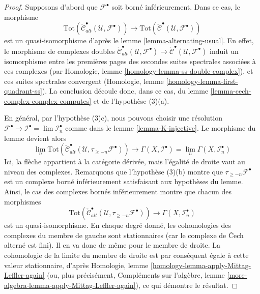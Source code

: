 \begin{proof}
Supposons d'abord que $\mathcal{F}^\bullet$ soit borné inférieurement. Dans ce cas, le morphisme $$
\text{Tot}(\check{\mathcal{C}}^\bullet_{alt}(\mathcal{U}, \mathcal{F}^\bullet))
\longrightarrow
\text{Tot}(\check{\mathcal{C}}^\bullet(\mathcal{U}, \mathcal{F}^\bullet))
$$ est un quasi-isomorphisme d'après le lemme \ref{lemma-alternating-usual}. En effet, le morphisme de complexes doubles $\check{\mathcal{C}}^\bullet_{alt}(\mathcal{U}, \mathcal{F}^\bullet) \to
\check{\mathcal{C}}^\bullet(\mathcal{U}, \mathcal{F}^\bullet)$ induit un isomorphisme entre les premières pages des secondes suites spectrales associées à ces complexes (par Homologie, lemme \ref{homology-lemma-ss-double-complex}), et ces suites spectrales convergent (Homologie, lemme \ref{homology-lemma-first-quadrant-ss}). La conclusion découle donc, dans ce cas, du lemme \ref{lemma-cech-complex-complex-computes} et de l'hypothèse (3)(a).

\medskip\noindent

En général, par l'hypothèse (3)c), nous pouvons choisir une résolution
$\mathcal{F}^\bullet \to \mathcal{I}^\bullet = \lim \mathcal{I}_n^\bullet$
comme dans le lemme \ref{lemma-K-injective}. Le morphisme du lemme devient alors
$$
\lim_n 
\text{Tot}(\check{\mathcal{C}}^\bullet_{alt}(\mathcal{U},
\tau_{\geq -n}\mathcal{F}^\bullet))
\longrightarrow
\Gamma(X, \mathcal{I}^\bullet) =
\lim_n \Gamma(X, \mathcal{I}_n^\bullet)
$$
Ici, la flèche appartient à la catégorie dérivée, mais l'égalité de droite vaut au niveau des complexes. Remarquons que l'hypothèse (3)(b) montre que $\tau_{\geq -n}\mathcal{F}^\bullet$
est un complexe borné inférieurement satisfaisant aux hypothèses du lemme. Ainsi, le cas des complexes bornés inférieurement montre que chacun des morphismes
$$
\text{Tot}(\check{\mathcal{C}}^\bullet_{alt}(\mathcal{U},
\tau_{\geq -n}\mathcal{F}^\bullet))
\longrightarrow
\Gamma(X, \mathcal{I}_n^\bullet)
$$
est un quasi-isomorphisme. En chaque degré donné, les cohomologies des complexes du membre de gauche sont stationnaires (car le complexe de {\v C}ech alterné est fini). Il en va donc de même pour le membre de droite. La cohomologie de la limite du membre de droite est par conséquent égale à cette valeur stationnaire, d'après Homologie, lemme \ref{homology-lemma-apply-Mittag-Leffler-again}
(ou, plus précisément, Compléments sur l'algèbre, lemme
\ref{more-algebra-lemma-apply-Mittag-Leffler-again}), ce qui démontre le résultat.

\end{proof}





